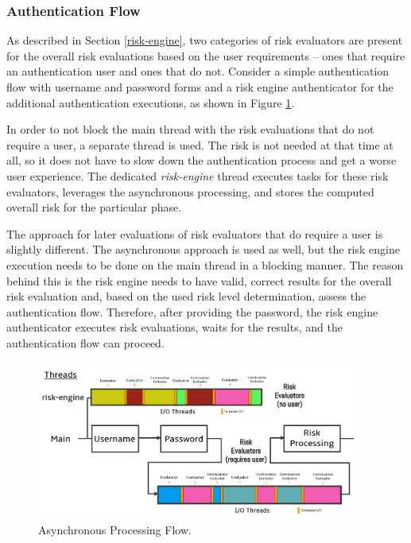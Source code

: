 \newpage

\subsubsection{Authentication Flow}
As described in Section \ref{risk-engine}, two categories of risk evaluators are present for the overall risk evaluations based on the user requirements -- ones that require an authentication user and ones that do not.
Consider a simple authentication flow with username and password forms and a risk engine authenticator for the additional authentication executions, as shown in Figure \ref{fig:impl-risk-engine-flow}.

In order to not block the main thread with the risk evaluations that do not require a user, a separate thread is used.
The risk is not needed at that time at all, so it does not have to slow down the authentication process and get a worse user experience.
The dedicated \textit{risk-engine} thread executes tasks for these risk evaluators, leverages the asynchronous processing, and stores the computed overall risk for the particular phase.

The approach for later evaluations of risk evaluators that do require a user is slightly different.
The asynchronous approach is used as well, but the risk engine execution needs to be done on the main thread in a blocking manner.
The reason behind this is the risk engine needs to have valid, correct results for the overall risk evaluation and, based on the used risk level determination, assess the authentication flow.
Therefore, after providing the password, the risk engine authenticator executes risk evaluations, waits for the results, and the authentication flow can proceed.

\begin{figure}[htbp]
  \centering
  \includegraphics[width=0.95\textwidth]{img/sections/6-implementation/async-flow-final.png}
  \caption{Asynchronous Processing Flow.}
  \label{fig:impl-risk-engine-flow}
\end{figure}

